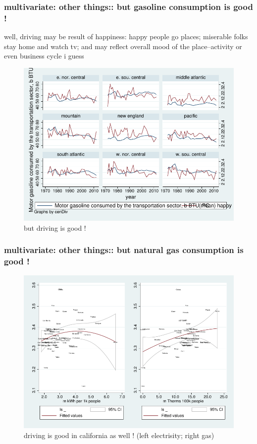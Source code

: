 \documentclass[10pt, letterpaper]{article}
\begin{document}
\begin{spacing}{1.4}
\subsubsection{multivariate: other things:: but gasoline consumption is good !}

well, driving may be result of happiness: happy people go places; miserable
folks stay home and watch tv; and may reflect overall mood of the
place--activity or even business cycle i guess

\begin{figure}[H]
 \includegraphics[width=6in]{graphsAndTables/cenDivLsYrMGAPB.pdf}\centering
\caption{but driving is good !}\label{cenDivLsYrMGAPB}
 \end{figure}

\subsubsection{multivariate: other things:: but natural gas consumption is good !}

\begin{figure}[H]
 \includegraphics[width=6in]{graphsAndTables/caEleGas.pdf}\centering
\caption{driving is good in california as well ! (left electrisity; right gas)}\label{cenDivLsYrMGAPB}
 \end{figure}


\end{spacing}
\end{document}
